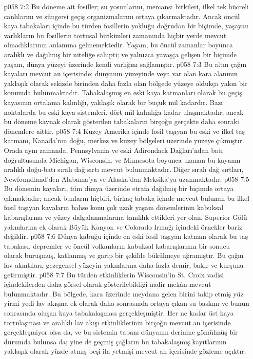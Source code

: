 \vs p058 7:2 Bu döneme ait fosiller; su yosunlarını, mercansı bitkileri, ilkel tek hücreli canlılarını ve süngersi geçiş organizmalarını ortaya çıkarmaktadır. Ancak öncül kaya tabakaları içinde bu türden fosillerin yokluğu doğrudan bir biçimde, yaşayan varlıkların bu fosillerin tortusal birikimleri zamanında hiçbir yerde mevcut olmadıklarının anlamına gelmemektedir. Yaşam, bu öncül zamanlar boyunca aralıklı ve dağılmış bir niteliğe sahipti; ve yalnızca yavaşça gelişen bir biçimde yaşam, dünya yüzeyi üzerinde kendi varlığını sağlamıştır.
\vs p058 7:3 Bu altın çağın kayaları mevcut an içerisinde; dünyanın yüzeyinde veya var olan kara alanının yaklaşık olarak sekizde birinden daha fazla olan bölgede yüzeye oldukça yakın bir konumda bulunmaktadır. Tabakalaşmış en eski kaya katmanları olarak bu geçiş kayasının ortalama kalınlığı, yaklaşık olarak bir buçuk mil kadardır. Bazı noktalarda bu eski kaya sistemleri, dört mil kalınlığa kadar ulaşmaktadır; ancak bu döneme kaynak olarak gösterilen tabakaların birçoğu gerçekte daha sonraki dönemlere aittir.
\vs p058 7:4 Kuzey Amerika içinde fosil taşıyan bu eski ve ilkel taş katmanı, Kanada’nın doğu, merkez ve kuzey bölgeleri üzerinde yüzeye çıkmıştır. Orada aynı zamanda, Pennsylvania ve eski Adirondack Dağları’ndan batı doğrultusunda Michigan, Wisconsin, ve Minnesota boyunca uzanan bu kayanın aralıklı doğu\hyp{}batı sıralı dağ sırtı mevcut bulunmaktadır. Diğer sıralı dağ sırtları, Newfoundland’den Alabama’ya ve Alaska’dan Meksika’ya uzanmaktadır.
\vs p058 7:5 Bu dönemin kayaları, tüm dünya üzerinde etrafa dağılmış bir biçimde ortaya çıkmaktadır; ancak bunların hiçbiri, birkaç tabaka içinde mevcut bulunan bu ilkel fosil taşıyan kayaların bahse konu çok uzak yaşam dönemlerinin kabuksal kabarışlarına ve yüzey dalgalanmalarına tanıklık ettikleri yer olan, Superior Gölü yakınlarına ek olarak Büyük Kanyon ve Colorado Irmağı içindeki örnekler bariz değildir.
\vs p058 7:6 Dünya kabuğu içinde en eski fosil taşıyan katman olarak bu taş tabakası, depremler ve öncül volkanların kabuksal kabarışlarının bir sonucu olarak buruşmuş, katlanmış ve garip bir şekilde bükülmeye uğramıştır. Bu çağın lav akıntıları, gezegensel yüzeyin yakınlarına daha fazla demir, bakır ve kurşunu getirmiştir.
\vs p058 7:7 Bu türden etkinliklerin Wisconsin’in St. Croix vadisi içindekilerden daha görsel olarak gösterilebildiği nadir mekân mevcut bulunmaktadır. Bu bölgede, kara üzerinde meydana gelen birini takip etmiş yüz yirmi yedi lav akışına ek olarak daha sonrasında ortaya çıkan su baskını ve bunun sonrasında oluşan kaya tabakalaşması gerçekleşmiştir. Her ne kadar üst kaya tortulaşması ve aralıklı lav akışı etkinliklerinin birçoğu mevcut an içerisinde gerçekleşmiyor olsa da, ve bu sistemin tabanı dünyanın derinine gömülmüş bir durumda bulunsa da; yine de geçmiş çağların bu tabakalaşmış kayıtlarının yaklaşık olarak yüzde atmış beşi ila yetmişi mevcut an içerisinde gözleme açıktır.
